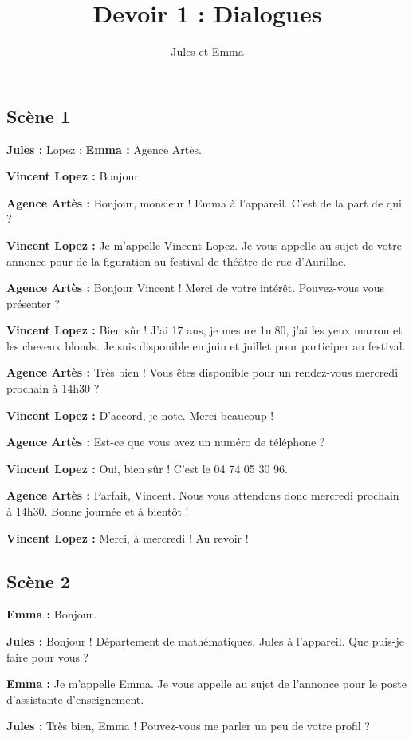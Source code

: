 \documentclass[a4paper,12pt]{article}
\title{Devoir 1 : Dialogues}
\author{Jules et Emma}
\begin{document}
\maketitle
\subsection*{Scène 1}
\textbf{Jules :} Lopez ; \textbf{Emma :} Agence Artès.

\bigskip

\textbf{Vincent Lopez :} Bonjour.

\textbf{Agence Artès :} Bonjour, monsieur ! Emma à l'appareil. C'est de la part de qui ?

\textbf{Vincent Lopez :} Je m'appelle Vincent Lopez. Je vous appelle au sujet de votre annonce pour de la figuration au festival de théâtre de rue d'Aurillac.

\textbf{Agence Artès :} Bonjour Vincent ! Merci de votre intérêt. Pouvez-vous vous présenter ?

\textbf{Vincent Lopez :} Bien sûr ! J'ai 17 ans, je mesure 1m80, j'ai les yeux marron et les cheveux blonds. Je suis disponible en juin et juillet pour participer au festival.

\textbf{Agence Artès :} Très bien ! Vous êtes disponible pour un rendez-vous mercredi prochain à 14h30 ?

\textbf{Vincent Lopez :} D'accord, je note. Merci beaucoup !

\textbf{Agence Artès :} Est-ce que vous avez un numéro de téléphone ?

\textbf{Vincent Lopez :} Oui, bien sûr ! C'est le 04 74 05 30 96.

\textbf{Agence Artès :} Parfait, Vincent. Nous vous attendons donc mercredi prochain à 14h30. Bonne journée et à bientôt !

\textbf{Vincent Lopez :} Merci, à mercredi ! Au revoir !

\bigskip
\subsection*{Scène 2}

\textbf{Emma :} Bonjour.

\textbf{Jules :} Bonjour ! Département de mathématiques, Jules à l'appareil. Que puis-je faire pour vous ?

\textbf{Emma :} Je m'appelle Emma. Je vous appelle au sujet de l'annonce pour le poste d'assistante d'enseignement.

\textbf{Jules :} Très bien, Emma ! Pouvez-vous me parler un peu de votre profil ?
\end{document}
